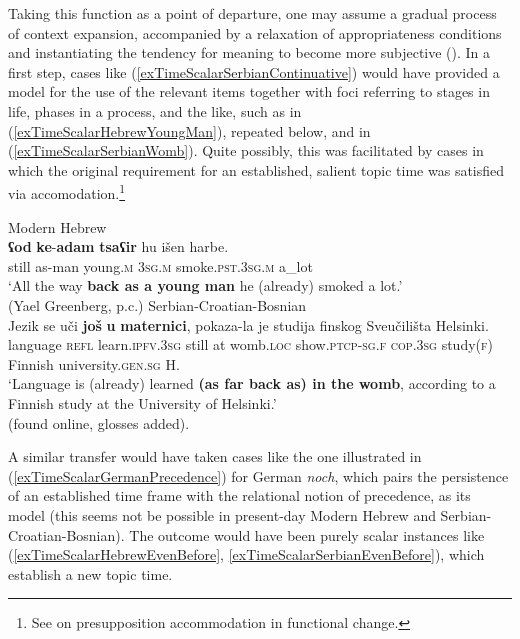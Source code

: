 Taking this function as a point of departure, one may assume a gradual process of context expansion, accompanied by a relaxation of appropriateness conditions and instantiating the tendency for meaning to become more subjective (). In a first step, cases like (\ref{exTimeScalarSerbianContinuative}) would have provided a model for the use of the relevant items together with foci referring to stages in life, phases in a process, and the like, such as in (\ref{exTimeScalarHebrewYoungMan}), repeated below, and in (\ref{exTimeScalarSerbianWomb}). Quite possibly, this was facilitated by cases in which the original requirement for an established, salient topic time was satisfied via accomodation.\footnote{See \textcite{SchwenterWaltereit2010} on presupposition accommodation in functional change.}

\begin{exe}[(225b)]
	Modern Hebrew\\		
		\gll \textbf{ʕod} \textbf{ke}-\textbf{adam} \textbf{tsaʕir} hu išen harbe.\\
		still as-man young.\textsc{m} 3\textsc{sg}.\textsc{m} smoke.\textsc{pst}.3\textsc{sg}.\textsc{m} a\_lot\\
		\glt \lq All the way \textbf{back as a young man} he (already) smoked a lot.\rq
		\\(Yael Greenberg, p.c.)
	\ex Serbian-Croatian-Bosnian \label{exTimeScalarSerbianWomb}\\
	\gll Jezik se uči \textbf{još} \textbf{u} \textbf{maternici}, pokaza-la je studija finskog Sveučilišta Helsinki.\\
	language \textsc{refl} learn.\textsc{ipfv}.3\textsc{sg} still at womb.\textsc{loc} show.\textsc{ptcp}-\textsc{sg}.\textsc{f} \textsc{cop}.3\textsc{sg} study(\textsc{f}) Finnish university.\textsc{gen}.\textsc{sg} H.\\
	\glt \lq Language is (already) learned \textbf{(as far back as) in the womb}, according to a Finnish study at the University of Helsinki.\rq{ }
	\\(found online, glosses added).%
\end{exe}

A similar transfer would have taken cases like the one illustrated in (\ref{exTimeScalarGermanPrecedence}) for German \textit{noch}, which pairs the persistence of an established time frame with the relational notion of precedence, as its model (this seems not be possible in present-day Modern Hebrew and Serbian\hyp Croatian\hyp Bosnian). The outcome would have been purely scalar instances like (\ref{exTimeScalarHebrewEvenBefore}, \ref{exTimeScalarSerbianEvenBefore}), which establish a new topic time. 

